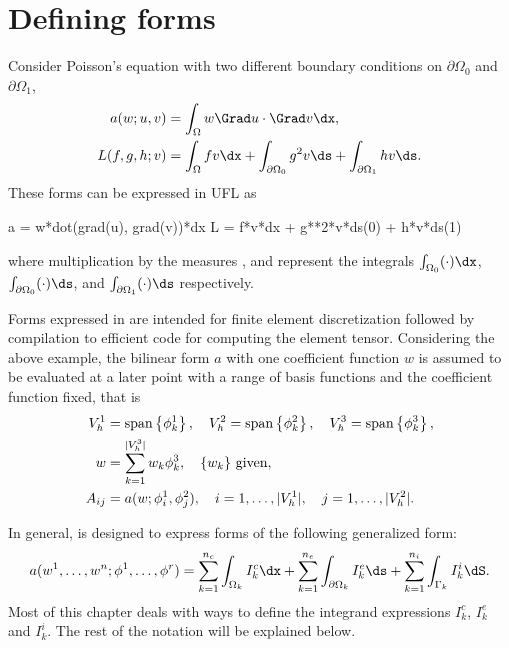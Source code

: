 \section{Defining forms}
\label{ufl:sec:forms}

Consider Poisson's equation with two different boundary
conditions on $\partial\Omega_0$ and $\partial\Omega_1$,
\begin{align}
a(w; u, v) &= \int_\Omega w \Grad u \cdot \Grad v \dx, \\
L(f, g, h; v) &= \int_\Omega f v \dx + \int_{\partial\Omega_0} g^2 v \ds + \int_{\partial\Omega_1} h v \ds.
\end{align}
These forms can be expressed in UFL as
\begin{python}
a = w*dot(grad(u), grad(v))*dx
L = f*v*dx + g**2*v*ds(0) + h*v*ds(1)
\end{python}
where multiplication by the measures ,  and 
represent the integrals $\int_{\Omega_0} (\cdot) \dx$,
$\int_{\partial\Omega_0} (\cdot) \ds$,
and $\int_{\partial\Omega_1} (\cdot) \ds$
respectively.

Forms expressed in \ufl{} are intended for finite element
discretization followed by compilation to efficient code for computing
the element tensor.  Considering the above example, the bilinear form
$a$ with one coefficient function $w$ is assumed to be evaluated at a
later point with a range of basis functions and the coefficient
function fixed, that is
\begin{align}
V_h^1 &= \operatorname{span}\left\{ \phi_k^1 \right\}, \quad V_h^2 = \operatorname{span}\left\{ \phi_k^2 \right\}, \quad V_h^3 = \operatorname{span}\left\{ \phi_k^3 \right\}, \\
w &= \sum_{k=1}^{|V^3_h|} w_k \phi_k^3, \quad \{ w_k \} \mbox{ given}, \\
A_{ij} &= a(w; \phi_i^1, \phi_j^2),
    \quad i = 1,\ldots,|V^1_h|, \quad j = 1,\ldots,|V^2_h| . \label{ufl:eq:Aij}
\end{align}

In general, \ufl{} is designed to express forms of the following generalized form:
\begin{align} \label{ufl:eq:form_integrals}
    a(w^1, \ldots, w^n; \phi^1, \ldots, \phi^r) =
           \sum_{k=1}^{n_c} \int_{\Omega_k}          I^c_k \dx
         + \sum_{k=1}^{n_e} \int_{\partial\Omega_k}  I^e_k \ds
         + \sum_{k=1}^{n_i} \int_{\Gamma_k}          I^i_k \dS.
\end{align}
Most of this chapter deals with ways to define the integrand
expressions $I^c_k$, $I^e_k$ and $I^i_k$.  The rest of the notation
will be explained below.

